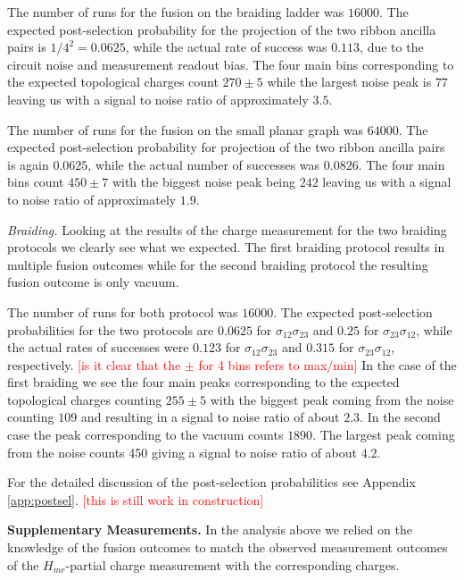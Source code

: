 \documentclass[two column]{article}
\newcommand{\caro}[1]{\textcolor{red}{[#1]}}
\begin{document}
The number of runs for the fusion on the braiding ladder was $16000$. The expected post-selection probability for the projection of the two ribbon ancilla pairs is $1/4^2=0.0625$, while the actual rate of success was $0.113$, due to the circuit noise and measurement readout bias. The four main bins corresponding to the expected topological charges count $270\pm5$ while the largest noise peak is $77$ leaving us with a signal to noise ratio of approximately $3.5$. 

The number of runs for the fusion on the small planar graph was $64000$. The expected post-selection probability for projection of the two ribbon ancilla pairs is again $0.0625$, while the actual number of successes was $0.0826$. The four main bins count $450\pm7$ with the biggest noise peak being $242$ leaving us with a signal to noise ratio of approximately $1.9$.

\emph{Braiding.}
Looking at the results of the charge measurement for the two braiding protocols we clearly see what we expected. The first braiding protocol results in multiple fusion outcomes while for the second braiding protocol the resulting fusion outcome is only vacuum.


The number of runs for both protocol was $16000$. The expected post-selection probabilities for the two protocols are $0.0625$ for $\sigma_{12}\sigma_{23}$ and $0.25$ for $\sigma_{23}\sigma_{12}$, while the actual rates of successes were $0.123$ for $\sigma_{12}\sigma_{23}$ and $0.315$ for $\sigma_{23}\sigma_{12}$, respectively.
\caro{is it clear that the $\pm$ for 4 bins refers to max/min}
In the case of the first braiding we see the four main peaks corresponding to the expected topological charges counting $255\pm 5$ with the biggest peak coming from the noise counting $109$ and resulting in a signal to noise ratio of about $2.3$. In the second case the peak corresponding to the vacuum counts $1890$. The largest peak coming from the noise counts 450 giving a signal to noise ratio of about $4.2$.

For the detailed discussion of the post-selection probabilities see Appendix \ref{app:postsel}.
\caro{this is still work in construction}


\textbf{Supplementary Measurements.} In the analysis above we relied on the knowledge of the fusion outcomes to match the observed measurement outcomes of the $H_{mr}$-partial charge measurement with the corresponding charges. 
\end{document}
